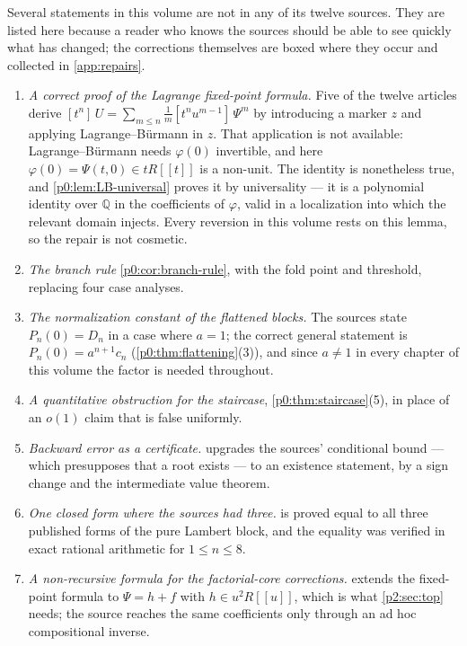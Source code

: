 \documentclass[11pt,a4paper,oneside]{book}
\theoremstyle{plain}
\theoremstyle{definition}
\theoremstyle{remark}
\newcommand{\Rat}{\mathbb{Q}}
\newcommand{\Coef}[1]{[#1]\,}
\newcommand{\littleo}{o}
\begin{document}
Several statements in this volume are not in any of its twelve sources.  They
are listed here because a reader who knows the sources should be able to see
quickly what has changed; the corrections themselves are boxed where they
occur and collected in \cref{app:repairs}.

\begin{enumerate}[label=(\arabic*),leftmargin=*]
\item \emph{A correct proof of the Lagrange fixed-point formula.}  Five of the
      twelve articles derive
      $\Coef{t^n}U=\sum_{m\le n}\tfrac1m\Coef{t^nu^{m-1}}\Psi^m$ by
      introducing a marker $z$ and applying Lagrange--Bürmann in $z$.  That
      application is not available: Lagrange--Bürmann needs $\varphi(0)$
      invertible, and here $\varphi(0)=\Psi(t,0)\in tR[[t]]$ is a non-unit.
      The identity is nonetheless true, and \cref{p0:lem:LB-universal} proves
      it by universality --- it is a polynomial identity over $\Rat$ in the
      coefficients of $\varphi$, valid in a localization into which the
      relevant domain injects.  Every reversion in this volume rests on this
      lemma, so the repair is not cosmetic.
\item \emph{The branch rule} \cref{p0:cor:branch-rule}, with the fold point
      and threshold, replacing four case analyses.
\item \emph{The normalization constant of the flattened blocks.}  The sources
      state $P_n(0)=D_n$ in a case where $a=1$; the correct general statement
      is $P_n(0)=a^{n+1}c_n$ (\cref{p0:thm:flattening}(3)), and since $a\ne1$
      in every chapter of this volume the factor is needed throughout.
\item \emph{A quantitative obstruction for the staircase},
      \cref{p0:thm:staircase}(5), in place of an $\littleo(1)$ claim that is
      false uniformly.
\item \emph{Backward error as a certificate.}  
      upgrades the sources' conditional bound --- which presupposes that a
      root exists --- to an existence statement, by a sign change and the
      intermediate value theorem.
\item \emph{One closed form where the sources had three.}
       is proved equal to all three published forms
      of the pure Lambert block, and the equality was verified in exact
      rational arithmetic for $1\le n\le8$.
\item \emph{A non-recursive formula for the factorial-core corrections.}
       extends the fixed-point formula to
      $\Psi=h+f$ with $h\in u^2R[[u]]$, which is what \cref{p2:sec:top}
      needs; the source reaches the same coefficients only through an ad hoc
      compositional inverse.
\end{enumerate}
\end{document}

